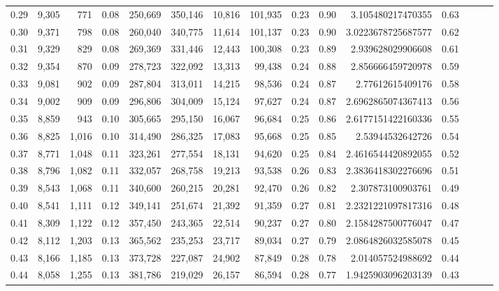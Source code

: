 \begin{tabular}{rrrrrrrrrrrrrrr}
0.29 &   9,305 &    771 &  0.08 &  250,669 &  350,146 &   10,816 &  101,935 &  0.23 &  0.90 &       3.105480217470355 &      0.63 \\
0.30 &   9,371 &    798 &  0.08 &  260,040 &  340,775 &   11,614 &  101,137 &  0.23 &  0.90 &      3.0223678725687577 &      0.62 \\
0.31 &   9,329 &    829 &  0.08 &  269,369 &  331,446 &   12,443 &  100,308 &  0.23 &  0.89 &       2.939628029906608 &      0.61 \\
0.32 &   9,354 &    870 &  0.09 &  278,723 &  322,092 &   13,313 &   99,438 &  0.24 &  0.88 &       2.856666459720978 &      0.59 \\
0.33 &   9,081 &    902 &  0.09 &  287,804 &  313,011 &   14,215 &   98,536 &  0.24 &  0.87 &        2.77612615409176 &      0.58 \\
0.34 &   9,002 &    909 &  0.09 &  296,806 &  304,009 &   15,124 &   97,627 &  0.24 &  0.87 &      2.6962865074367413 &      0.56 \\
0.35 &   8,859 &    943 &  0.10 &  305,665 &  295,150 &   16,067 &   96,684 &  0.25 &  0.86 &      2.6177151422160336 &      0.55 \\
0.36 &   8,825 &  1,016 &  0.10 &  314,490 &  286,325 &   17,083 &   95,668 &  0.25 &  0.85 &        2.53944532642726 &      0.54 \\
0.37 &   8,771 &  1,048 &  0.11 &  323,261 &  277,554 &   18,131 &   94,620 &  0.25 &  0.84 &      2.4616544420892055 &      0.52 \\
0.38 &   8,796 &  1,082 &  0.11 &  332,057 &  268,758 &   19,213 &   93,538 &  0.26 &  0.83 &      2.3836418302276696 &      0.51 \\
0.39 &   8,543 &  1,068 &  0.11 &  340,600 &  260,215 &   20,281 &   92,470 &  0.26 &  0.82 &       2.307873100903761 &      0.49 \\
0.40 &   8,541 &  1,111 &  0.12 &  349,141 &  251,674 &   21,392 &   91,359 &  0.27 &  0.81 &      2.2321221097817316 &      0.48 \\
0.41 &   8,309 &  1,122 &  0.12 &  357,450 &  243,365 &   22,514 &   90,237 &  0.27 &  0.80 &      2.1584287500776047 &      0.47 \\
0.42 &   8,112 &  1,203 &  0.13 &  365,562 &  235,253 &   23,717 &   89,034 &  0.27 &  0.79 &      2.0864826032585078 &      0.45 \\
0.43 &   8,166 &  1,185 &  0.13 &  373,728 &  227,087 &   24,902 &   87,849 &  0.28 &  0.78 &       2.014057524988692 &      0.44 \\
0.44 &   8,058 &  1,255 &  0.13 &  381,786 &  219,029 &   26,157 &   86,594 &  0.28 &  0.77 &      1.9425903096203139 &      0.43 \\

\end{tabular}
